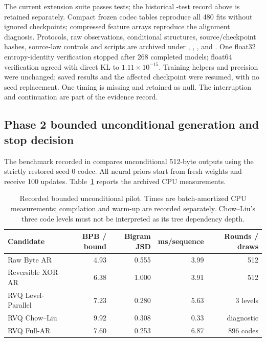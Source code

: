 {\raggedright
The current extension suite passes \CurrentTestCases{} tests; the historical
\TestCases{}-test record above is retained separately. Compact frozen codec tables reproduce all 480 fits without ignored checkpoints;
compressed feature arrays reproduce the alignment diagnosis. Protocols, raw
observations, conditional structures, source/checkpoint hashes, source-law
controls and scripts are archived under ,
, ,
 and .
One float32 entropy-identity verification stopped after 268 completed models;
float64 verification agreed with direct KL to \(1.11\times10^{-15}\). Training
helpers and precision were unchanged; saved results and the affected checkpoint
were resumed, with no seed replacement. One timing is missing and retained as
null. The interruption and continuation are part of the evidence record.\par}


\subsection{Phase 2 bounded unconditional generation and stop decision}
The benchmark recorded in 
compares unconditional 512-byte outputs using the strictly restored seed-0 codec.
All neural priors start from fresh weights and receive 100 updates.
Table~\ref{tab:unconditional-pilot} reports the archived CPU measurements.
\begin{table}[ht]
\centering
\small
\begin{tabular}{lrrrr}
\hline
Candidate & BPB / bound & Bigram JSD & ms/sequence & Rounds / draws\\
\hline
Raw Byte AR & 4.93 & 0.555 & 3.99 & 512\\
Reversible XOR AR & 6.38 & 1.000 & 3.91 & 512\\
RVQ Level-Parallel & 7.23 & 0.280 & 5.63 & 3 levels\\
RVQ Chow--Liu & 9.92 & 0.308 & 0.33 & diagnostic\\
RVQ Full-AR & 7.60 & 0.253 & 6.87 & 896 codes\\
\hline
\end{tabular}
\caption{Recorded bounded unconditional pilot. Times are batch-amortized CPU
measurements; compilation and warm-up are recorded separately. Chow--Liu's
three code levels must not be interpreted as its tree dependency depth.}
\label{tab:unconditional-pilot}
\end{table}


